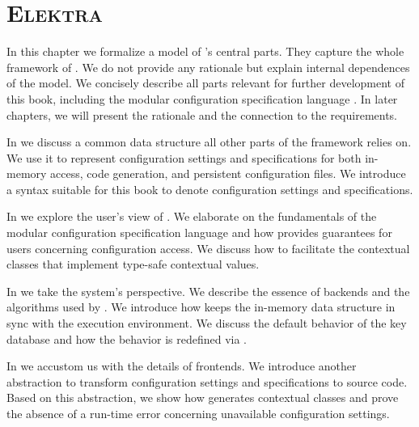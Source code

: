 \chapter{\textsc{Elektra}}
\label{chapter:approach}

\chapterhung

In this chapter we formalize a model of \elektra{}'s central parts.
They capture the whole framework of \elektra{}.
We do not provide any rationale but explain internal dependences of the model.
We concisely describe all parts relevant for further development of this book, including the modular configuration specification language .
In later chapters, we will present the rationale and the connection to the requirements.

In  we discuss a common data structure all other parts of the framework \elektra{} relies on.
We use it to represent configuration settings and specifications for both in-memory access, code generation, and persistent configuration files.
We introduce a syntax suitable for this book to denote configuration settings and specifications.

In  we explore the user's view of \elektra{}.
We elaborate on the fundamentals of the modular configuration specification language  and how  provides guarantees for users concerning configuration access.
We discuss how to facilitate the contextual classes that implement type-safe contextual values.

In  we take the system's perspective.
We describe the essence of backends and the algorithms used by .
We introduce how  keeps the in-memory data structure in sync with the execution environment.
We discuss the default behavior of the key database and how the behavior is redefined via .

In  we accustom us with the details of frontends.
We introduce another abstraction to transform configuration settings and specifications to source code.
Based on this abstraction, we show how  generates contextual classes and prove the absence of a run-time error concerning unavailable configuration settings.













